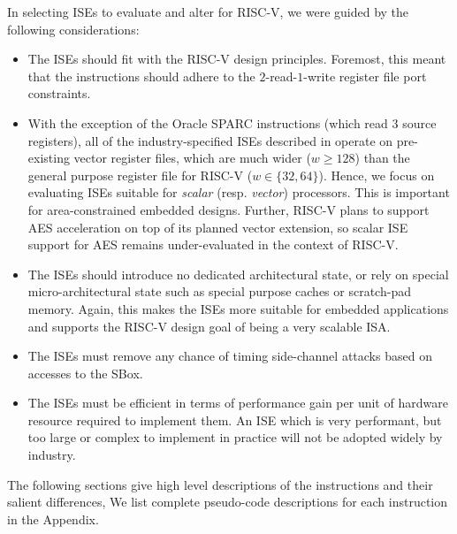 
In selecting ISEs to evaluate and alter for RISC-V, we were guided by the
following considerations:

\begin{itemize}
\item The ISEs should fit with the RISC-V design principles.
      Foremost, this meant that the instructions should adhere to
      the $2$-read-$1$-write register file port constraints.
\item With the exception of the Oracle SPARC
      instructions (which read $3$ source registers),
      all of the industry-specified ISEs described in
       operate on pre-existing vector
      register files, which are much wider ($w\ge128$) than the
      general purpose register file for RISC-V ($w\in\{32,64\}$).
      Hence, we focus on evaluating ISEs suitable for {\em scalar}
      (resp. {\em vector}) processors.
      This is important for area-constrained embedded designs.
      Further, RISC-V plans to support AES acceleration on top of
      its planned vector extension, so scalar ISE support for
      AES remains under-evaluated in the context of RISC-V.
\item The ISEs should introduce no dedicated architectural state, or
      rely on special micro-architectural state such as special
      purpose caches or scratch-pad memory.
      Again, this makes the ISEs more suitable for embedded
      applications and supports the RISC-V design goal of being
      a very scalable ISA.
\item The ISEs must remove any chance of timing side-channel attacks
      based on accesses to the SBox.
\item The ISEs must be efficient in terms of performance gain per
      unit of hardware resource required to implement them.
      An ISE which is very performant, but too large or complex to implement
      in practice will not be adopted widely by industry.
\end{itemize}

The following sections give high level descriptions of the
instructions and their salient differences,
We list complete pseudo-code descriptions for each instruction
in the Appendix.

